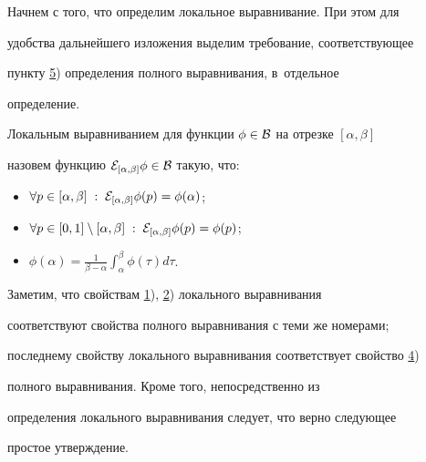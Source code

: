 \smallskip



Начнем с того, что определим локальное выравнивание. При этом для

удобства дальнейшего изложения выделим требование, соответствующее

пункту \hyperlink{palin:5}{5}) определения полного выравнивания, в~отдельное

определение.



\smallskip



\begin{definition}[5]Локальным выравниванием для функции $\phi\in{\cal B}$ на отрезке $[\alpha,\beta]$

назовем функцию ${\cal E}_{[\alpha,\beta]}\phi\in{\cal B}$ такую, что:

\begin{itemize}

\item[1)]\hypertarget{palin:1}{} $\forall p\in[\alpha,\beta]\;:\;{\cal E}_{[\alpha,\beta]}\phi(p)=\phi(\alpha)$;

\item[2)]\hypertarget{palin:2}{} $\forall p\in[0,1]\setminus[\alpha,\beta]\;:\;{\cal E}_{[\alpha,\beta]}\phi(p)=\phi(p)$;

\item[3)] $\displaystyle \phi(\alpha)=\frac{1}{\beta-\alpha}\int _{\alpha}^{\beta}\phi(\tau)d\tau$.

\end{itemize}

\end{definition}



\smallskip



Заметим, что свойствам \hyperlink{palin:1}{1}), \hyperlink{palin:2}{2})    локального выравнивания

соответствуют свойства полного выравнивания с теми же номерами;

последнему свойству локального выравнивания соответствует свойство \hyperlink{palin:4}{4}) 

 полного выравнивания. Кроме того, непосредственно из

определения локального выравнивания следует, что верно следующее

простое утверждение.



